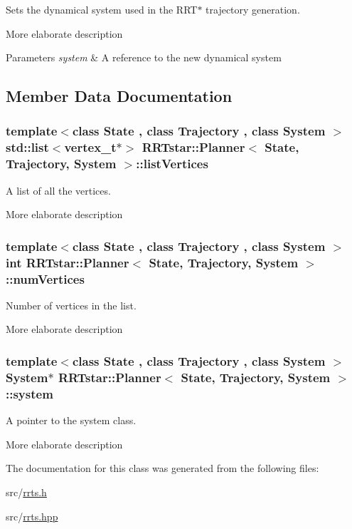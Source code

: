 Sets the dynamical system used in the R\-R\-T$\ast$ trajectory generation. 

More elaborate description


\begin{DoxyParams}{Parameters}
{\em system} & A reference to the new dynamical system \\
\hline
\end{DoxyParams}


\subsection{Member Data Documentation}
\hypertarget{class_r_r_tstar_1_1_planner_a642f179eb8d92b05374dc9c800a7f4f9}{
\subsubsection[{list\-Vertices}]{\setlength{\rightskip}{0pt plus 5cm}template$<$class State , class Trajectory , class System $>$ std\-::list$<${\bf vertex\-\_\-t}$\ast$$>$ {\bf R\-R\-Tstar\-::\-Planner}$<$ {\bf State}, {\bf Trajectory}, {\bf System} $>$\-::list\-Vertices}}\label{class_r_r_tstar_1_1_planner_a642f179eb8d92b05374dc9c800a7f4f9}


A list of all the vertices. 

More elaborate description \hypertarget{class_r_r_tstar_1_1_planner_ae22532c4b2619f18c7c28b6781617b82}{
\subsubsection[{num\-Vertices}]{\setlength{\rightskip}{0pt plus 5cm}template$<$class State , class Trajectory , class System $>$ int {\bf R\-R\-Tstar\-::\-Planner}$<$ {\bf State}, {\bf Trajectory}, {\bf System} $>$\-::num\-Vertices}}\label{class_r_r_tstar_1_1_planner_ae22532c4b2619f18c7c28b6781617b82}


Number of vertices in the list. 

More elaborate description \hypertarget{class_r_r_tstar_1_1_planner_a5472cbb3b3f13ceb5987507b6db0558b}{
\subsubsection[{system}]{\setlength{\rightskip}{0pt plus 5cm}template$<$class State , class Trajectory , class System $>$ {\bf System}$\ast$ {\bf R\-R\-Tstar\-::\-Planner}$<$ {\bf State}, {\bf Trajectory}, {\bf System} $>$\-::system}}\label{class_r_r_tstar_1_1_planner_a5472cbb3b3f13ceb5987507b6db0558b}


A pointer to the system class. 

More elaborate description 

The documentation for this class was generated from the following files\-:\begin{DoxyCompactItemize}
\item 
src/\hyperlink{rrts_8h}{rrts.\-h}\item 
src/\hyperlink{rrts_8hpp}{rrts.\-hpp}\end{DoxyCompactItemize}

